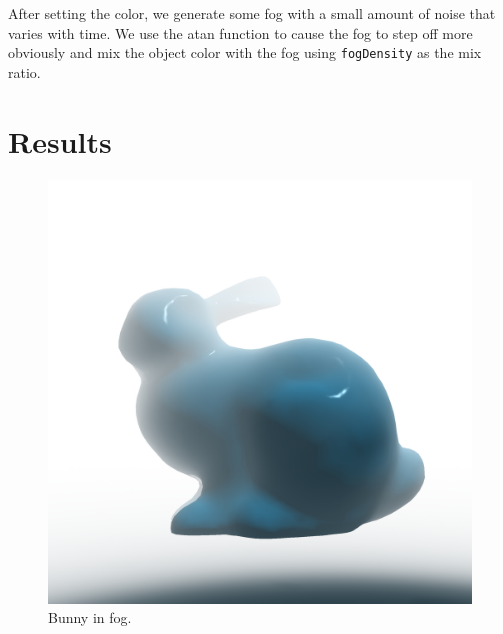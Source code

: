 \documentclass[12pt,letterpaper]{article}
\begin{document}
After setting the color, we generate some fog with a small amount of noise that
varies with time. We use the atan function to cause the fog to step off more
obviously and mix the object color with the fog using {\tt fogDensity} as the
mix ratio.

\newpage
\section*{Results}

\begin{figure}[!h]
    \centering
    \includegraphics[width=1.0\textwidth]{img/fogbunny.png}
    \caption{Bunny in fog.}
\end{figure}
\end{document}
